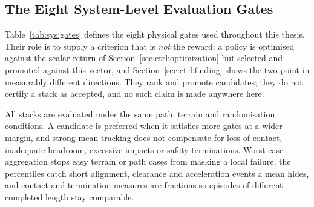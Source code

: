 \subsection{The Eight System-Level Evaluation Gates}
\label{sec:sys:gates}

Table~\ref{tab:sys:gates} defines the eight physical gates used throughout this
thesis. Their role is to supply a criterion that is \emph{not} the reward: a
policy is optimised against the scalar return of
Section~\ref{sec:ctrl:optimization} but selected and promoted against this
vector, and Section~\ref{sec:ctrl:finding} shows the two point in measurably
different directions. They rank and promote candidates; they do not certify a
stack as accepted, and no such claim is made anywhere here.

All stacks are evaluated under the same path, terrain and randomisation
conditions. A candidate is preferred when it satisfies more gates at a wider
margin, and strong mean tracking does not compensate for loss of contact,
inadequate headroom, excessive impacts or safety terminations. Worst-case
aggregation stops easy terrain or path cases from masking a local failure, the
percentiles catch short alignment, clearance and acceleration events a mean
hides, and contact and termination measures are fractions so episodes of
different completed length stay comparable.

